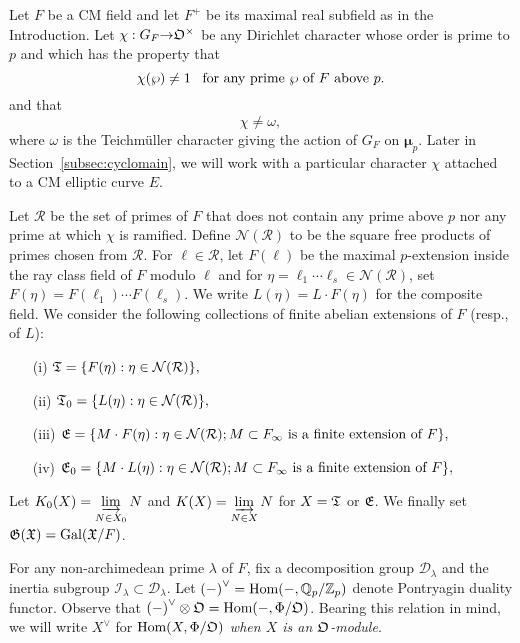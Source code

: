 \documentclass[12pt]{amsart}
\numberwithin{equation}{section}
\begin{document}
Let $F$ be a CM field and let $F^+$ be its maximal real subfield as in the Introduction. 
Let $\chi:G_F {\rightarrow} {\frak{O}}^\times$ be any Dirichlet character whose order is prime to $p$ and which has the property that
\begin{equation}
\label{eqn:assnotrivxhi}
\chi(\wp)\neq 1 
\hbox{  \, for any prime   } \wp \hbox{ of } F \hbox{ above } p.
\end{equation}
and that
\begin{equation}
\label{eqn:chiisnotteich}
\chi \neq \omega,
\end{equation}
where $\omega$ is the Teichm\"uller character giving the action of $G_F$ on $\pmb{\mu}_p$. Later in Section~\ref{subsec:cyclomain}, we will work with a particular character $\chi$ attached to a CM elliptic curve $E$.

Let $\mathcal{R}$ be the set of primes of $F$ that does not contain any prime above $p$ nor any prime at which $\chi$ is ramified. Define ${\mathcal{N}}(\mathcal{R})$ to be the square free products of primes chosen from $\mathcal{R}$. For $\ell\in \mathcal{R}$, let $F(\ell)$ be the maximal $p$-extension inside the ray class field of $F$ modulo $\ell$ and for $\eta=\ell_1\cdots\ell_s \in {\mathcal{N}}(\mathcal{R})$, set $F(\eta)=F(\ell_1)\cdots F(\ell_s)$. We write $L(\eta)=L\cdot F(\eta)$ for the composite field. We consider the following collections of finite abelian extensions of $F$ (resp., of $L$):
\begin{itemize}
\item[(i)] $\frak{T}=\{F(\eta): \eta \in {\mathcal{N}}(\mathcal{R})\},$
\item[(ii)] $\frak{T}_0=\{L(\eta): \eta \in {\mathcal{N}}(\mathcal{R})\},$
\item[(iii)] $\frak{E}=\{M\cdot F(\eta): \eta \in {\mathcal{N}}(\mathcal{R}); M\subset F_\infty \hbox{ is a finite extension of } F\},$
\item[(iv)] $\frak{E}_0=\{M\cdot L(\eta): \eta \in {\mathcal{N}}(\mathcal{R}); M\subset F_\infty \hbox{ is a finite extension of } F\},$
\end{itemize}
Let $\displaystyle{{K}_0(X)=\varinjlim_{N \in X_0}N}$ and $\displaystyle{{K}(X)=\varinjlim_{N \in X}N}$ for $X=\frak{T}$ or $\frak{E}$. 
We finally set $\frak{G(X)}=\textup{Gal}(\frak{X}/F)$.   

For any non-archimedean prime $\lambda$ of $F$, fix a decomposition group $\mathcal{D}_{\lambda}$ and the inertia subgroup $\mathcal{I}_\lambda \subset \mathcal{D}_{\lambda}$. Let ${(-)}^\vee=\textup{Hom}(-,{\mathbb{Q}}_p/{\mathbb{Z}}_p)$ denote Pontryagin duality functor. Observe that ${(-)}^\vee\otimes{\frak{O}}=\textup{Hom}(-,\Phi/{\frak{O}})$. Bearing this relation in mind, we will write $X^\vee$ for $\textup{Hom}(X,\Phi/{\frak{O}})$ \emph{when $X$ is an ${\frak{O}}$-module}.
\end{document}
